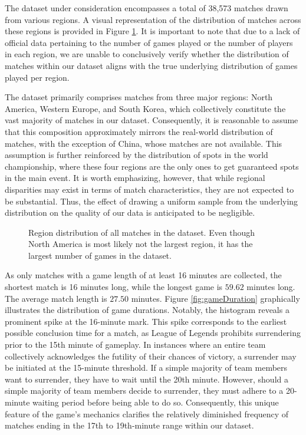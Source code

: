 \documentclass[12pt, a4paper, headinclude, twoside, plainheadsepline, open=right, numbers=noenddot, hidelinks, toc=listof, toc=bibliography]{scrreprt}
\begin{document}
The dataset under consideration encompasses a total of 38,573 matches drawn from various regions. 
A visual representation of the distribution of matches across these regions is provided in Figure \ref{fig:platformId}.
It is important to note that due to a lack of official data pertaining to the number of games played or the number of players in each region, we are unable to conclusively verify whether the distribution of matches within our dataset aligns with the true underlying distribution of games played per region.

The dataset primarily comprises matches from three major regions: North America, Western Europe, and South Korea, which collectively constitute the vast majority of matches in our dataset. 
Consequently, it is reasonable to assume that this composition approximately mirrors the real-world distribution of matches, with the exception of China, whose matches are not available.
This assumption is further reinforced by the distribution of spots in the world championship, where these four regions are the only ones to get guaranteed spots in the main event.
It is worth emphasizing, however, that while regional disparities may exist in terms of match characteristics, they are not expected to be substantial. Thus, the effect of drawing a uniform sample from the underlying distribution on the quality of our data is anticipated to be negligible.

\begin{figure}[ht]

\caption{Region distribution of all matches in the dataset. Even though North America is most likely not the largest region, it has the largest number of games in the dataset.}
\label{fig:platformId}
\end{figure}

As only matches with a game length of at least 16 minutes are collected, the shortest match is 16 minutes long, while the longest game is $59.62$ minutes long.
The average match length is $27.50$ minutes.
Figure \ref{fig:gameDuration} graphically illustrates the distribution of game durations. 
Notably, the histogram reveals a prominent spike at the 16-minute mark.
This spike corresponds to the earliest possible conclusion time for a match, as League of Legends prohibits surrendering prior to the 15th minute of gameplay. In instances where an entire team collectively acknowledges the futility of their chances of victory, a surrender may be initiated at the 15-minute threshold.
If a simple majority of team members want to surrender, they have to wait until the 20th minute.
However, should a simple majority of team members decide to surrender, they must adhere to a 20-minute waiting period before being able to do so. 
Consequently, this unique feature of the game's mechanics clarifies the relatively diminished frequency of matches ending in the 17th to 19th-minute range within our dataset.
\end{document}

